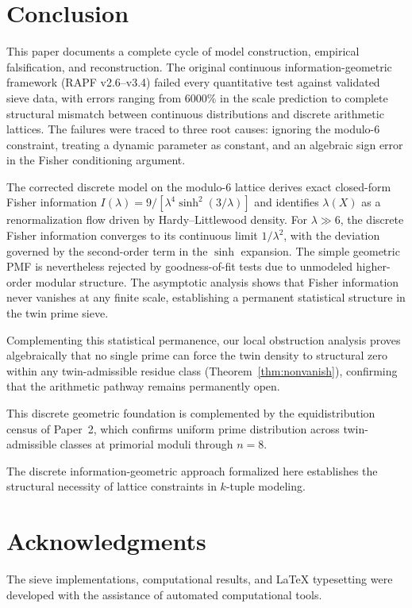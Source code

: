\documentclass[11pt]{article}
\begin{document}
\section{Conclusion}

This paper documents a complete cycle of model construction, empirical falsification, and reconstruction. The original continuous information-geometric framework (RAPF v2.6--v3.4) failed every quantitative test against validated sieve data, with errors ranging from $6000\%$ in the scale prediction to complete structural mismatch between continuous distributions and discrete arithmetic lattices. The failures were traced to three root causes: ignoring the modulo-6 constraint, treating a dynamic parameter as constant, and an algebraic sign error in the Fisher conditioning argument.

The corrected discrete model on the modulo-6 lattice derives exact closed-form Fisher information $I(\lambda) = 9/[\lambda^4 \sinh^2(3/\lambda)]$ and identifies $\lambda(X)$ as a renormalization flow driven by Hardy--Littlewood density. For $\lambda \gg 6$, the discrete Fisher information converges to its continuous limit $1/\lambda^2$, with the deviation governed by the second-order term in the $\sinh$ expansion. The simple geometric PMF is nevertheless rejected by goodness-of-fit tests due to unmodeled higher-order modular structure. The asymptotic analysis shows that Fisher information never vanishes at any finite scale, establishing a permanent statistical structure in the twin prime sieve.

Complementing this statistical permanence, our local obstruction analysis proves algebraically that no single prime can force the twin density to structural zero within any twin-admissible residue class (Theorem~\ref{thm:nonvanish}), confirming that the arithmetic pathway remains permanently open.

This discrete geometric foundation is complemented by the equidistribution census of Paper~2, which confirms uniform prime distribution across twin-admissible classes at primorial moduli through $n=8$.

The discrete information-geometric approach formalized here establishes the structural necessity of lattice constraints in $k$-tuple modeling.

\section*{Acknowledgments}

The sieve implementations, computational results, and LaTeX typesetting were developed with the assistance of automated computational tools.
\end{document}
